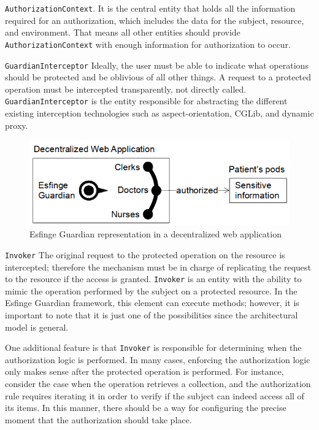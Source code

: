 \documentclass[sigconf]{acmart}
\begin{document}
\vspace{0.8mm} \noindent \verb|AuthorizationContext|. It is the central entity that holds all the information required for an authorization, which includes the data for the subject, resource, and environment. That means all other entities should provide \verb|AuthorizationContext| with enough information for authorization to occur.

\vspace{0.8mm} \noindent \verb|GuardianInterceptor|
Ideally, the user must be able to indicate what operations should be protected and be oblivious of all other things. A request to a protected operation must be intercepted transparently, not directly called. \verb|GuardianInterceptor| is the entity responsible for abstracting the different existing interception technologies such as aspect-orientation, CGLib, and dynamic proxy.

\begin{figure}
  \centering
  \includegraphics[scale=0.5]{img/guardian-in-decentralized-webapp.png}
  \caption{Esfinge Guardian representation in a decentralized web application}
  \label{fig:guardian-in-decentralized-webapp}
\end{figure}

\vspace{0.8mm} \noindent \verb|Invoker|
The original request to the protected operation on the resource is intercepted; therefore the mechanism must be in charge of replicating the request to the resource if the access is granted. \verb|Invoker| is an entity with the ability to mimic the operation performed by the subject on a protected resource. In the Esfinge Guardian framework, this element can execute methods; however, it is important to note that it is just one of the possibilities since the architectural model is general.

One additional feature is that \verb|Invoker| is responsible for determining when the authorization logic is performed. In many cases, enforcing the authorization logic only makes sense after the protected operation is performed. For instance, consider the case when the operation retrieves a collection, and the authorization rule requires iterating it in order to verify if the subject can indeed access all of its items. In this manner, there should be a way for configuring the precise moment that the authorization should take place.
\end{document}
